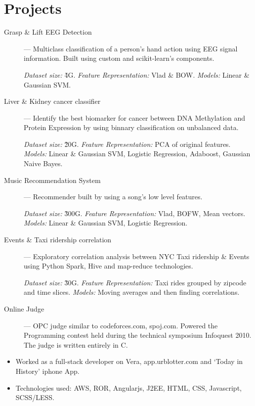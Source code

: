 \documentclass{resume}
\begin{document}
\section{Projects}
  \begin{description}
    \item[Grasp \& Lift EEG Detection] --- Multiclass classification of a person's hand action using EEG signal information.  Built using custom and scikit-learn's components.
      \par \textit{Dataset size:} \~4G.  \textit{Feature Representation:} Vlad \& BOW\@.  \textit{Models:} Linear \& Gaussian SVM\@.
    \item[Liver \& Kidney cancer classifier] --- Identify the best biomarker for cancer between DNA Methylation and Protein Expression by using binnary classification on unbalanced data.
      \par \textit{Dataset size:} \~20G.  \textit{Feature Representation:} PCA of original features.  \textit{Models:} Linear \& Gaussian SVM\@, Logistic Regression, Adaboost, Gaussian Naive Bayes.
    \item[Music Recommendation System] --- Recommender built by using a song's low level features.
      \par \textit{Dataset size:} \~300G.  \textit{Feature Representation:} Vlad, BOFW, Mean vectors.  \textit{Models:} Linear \& Gaussian SVM, Logistic Regression.
    \item[Events \& Taxi ridership correlation] --- Exploratory correlation analysis between NYC Taxi ridership \& Events using Python Spark, Hive and map-reduce technologies.
      \par \textit{Dataset size:} \~30G. \textit{Feature Representation:} Taxi rides grouped by zipcode and time slices.  \textit{Models:} Moving averages and then finding correlations.
    \item[Online Judge] --- OPC judge similar to codeforces.com, spoj.com.  Powered the Programming contest held during the technical symposium Infoquest 2010.  The judge is written entirely in C.
  \end{description}


\begin{itemize} \itemsep1pt \parskip0pt
  \item Worked as a full-stack developer on Vera, app.urblotter.com and `Today in History' iphone App.
  \item Technologies used: AWS, ROR, Angularjs, J2EE, HTML, CSS, Javascript, SCSS/LESS\@.
\end{itemize}
\end{document}

